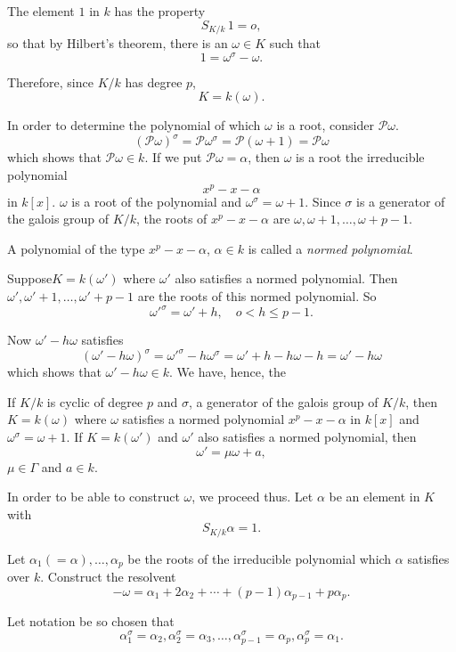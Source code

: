 The element $1$ in $k$ has the property
$$
S_{K/k} \, 1 =o,
$$
so that by Hilbert's theorem, there is an $\omega \in K $ such that 
$$
1 = \omega^\sigma -\omega .
$$

Therefore, since $K/k$ has degree $p$,
$$
K =k(\omega).
$$

In order to determine the polynomial of which $\omega$ is a root,
consider $\mathscr{P} \omega$. 
$$
(\mathscr{P} \omega)^\sigma = \mathscr{P} \omega^\sigma =
\mathscr{P}(\omega +1) =\mathscr{P} \omega  
$$
which shows that $\mathscr{P} \omega \in k$. If we put $\mathscr{P}
\omega = \alpha$, then $\omega$ is a root the irreducible polynomial 
$$
x^p - x - \alpha
$$
in $k[x]$. $\omega$ is a root of the polynomial and $\omega^\sigma = 
\omega + 1$. 
Since $\sigma$ is a generator of the galois group of $K/k$, the roots
of $x^p - x - \alpha$ are $\omega, \omega + 1,\ldots , \omega+p-1$.  

A polynomial of the type $x^p - x - \alpha$, $\alpha \in k$ is called a
\textit{normed polynomial}. 

Suppose\pageoriginale $K=k(\omega')$ where $\omega'$ also satisfies a
normed polynomial. Then $\omega' , \omega'+1,\ldots,\omega'+p-1$ are
the roots of this normed polynomial. So  
$$
\omega'^\sigma = \omega' + h, \quad o < h \leq p-1.
$$

Now $\omega' - h \omega $ satisfies
$$
(\omega'-h \omega)^\sigma = \omega'^\sigma - h \omega^\sigma
=\omega'+h -h \omega - h = \omega' - h \omega 
$$
which shows that $\omega'-h \omega \in k$. We have, hence, the 

\begin{thm}\label{c6:thm10} %
 If $K/k$ is cyclic of degree $p$ and $\sigma$, a generator of the
  galois group of $K/k$, then $K=k(\omega)$ where $\omega$ satisfies a
  normed polynomial $x^p - x- \alpha$ in $k[x]$ and $\omega^\sigma =
  \omega + 1$. 
If $K=k(\omega')$ and $\omega'$ also satisfies a normed polynomial,
then 
$$
\omega' = \mu \omega + a,
$$
$\mu \in \Gamma$ and $a \in k$.
\end{thm}

In order to be able to construct $\omega$, we proceed thus. Let
$\alpha$ be an element in $K$ with 
$$
S_{K/k} \alpha =1.
$$

Let $\alpha_1 (= \alpha),\ldots , \alpha_p$ be the roots of the
irreducible polynomial which $\alpha$ satisfies over $k$. Construct
the resolvent 
$$
-\omega = \alpha_1 + 2 \alpha_2 + \cdots +(p-1) \alpha_{p-1} + p
\alpha_p. 
$$

Let notation be so chosen that
$$
\alpha^\sigma_1 = \alpha_2, \alpha^\sigma_2 =
\alpha_3,\ldots,\alpha^\sigma_{p-1} = \alpha_p, \alpha^\sigma_p =
\alpha_1. 
$$  


